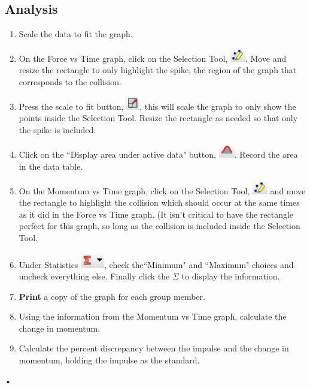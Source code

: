 \documentclass[main.tex]{subfiles}
\begin{document}
\subsection*{Analysis}
\begin{enumerate}
\item
Scale the data to fit the graph.
\item
On the Force vs Time graph, click on the Selection Tool, \includegraphics{Selection_Tool}. Move and resize the rectangle to only highlight the spike, the region of the graph that corresponds to the collision.
\item
Press the scale to fit button, \includegraphics{Rescale}, this will scale the graph to only show the points inside the Selection Tool. Resize the rectangle as needed so that only the spike is included.
\item
Click on the ``Display area under active data" button, \includegraphics{Area_Under_Curve}. Record the area in the data table.
\item
On the Momentum vs Time graph, click on the Selection Tool, \includegraphics{Selection_Tool} and move the rectangle to highlight the collision which should occur at the same times as it did in the Force vs Time graph. (It isn't critical to have the rectangle perfect for this graph, so long as the collision is included inside the Selection Tool.
\item
Under Statistics \includegraphics{Statistics}, check the``Minimum" and ``Maximum" choices and uncheck everything else. Finally click the $\Sigma$ to display the information.
\item
\textbf{Print} a copy of the graph for each group member.
\item
Using the information from the Momentum vs Time graph, calculate the change in momentum.
\item
Calculate the percent discrepancy between the impulse and the change in momentum, holding the impulse as the standard.
\end{enumerate}•
\end{document}
